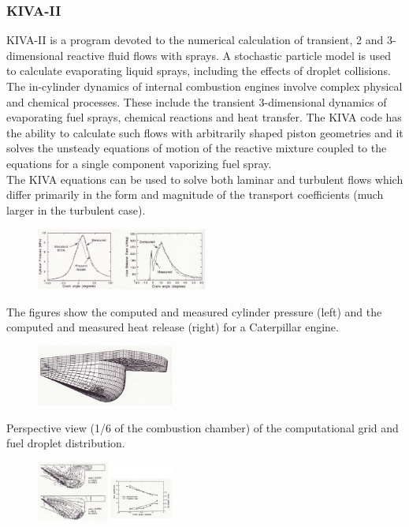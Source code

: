 \documentclass[12pt]{article}
\begin{document}
\subsubsection{KIVA-II}

KIVA-II is a program devoted to the numerical calculation of transient, 2 and 3-dimensional reactive fluid flows with sprays. A stochastic particle model is used to calculate evaporating liquid sprays, including the effects of droplet collisions.\\
The in-cylinder dynamics of internal combustion engines involve complex physical and chemical processes. These include the transient 3-dimensional dynamics of evaporating fuel sprays, chemical reactions and heat transfer. The KIVA code has the ability to calculate such flows with arbitrarily shaped piston geometries and it solves the unsteady equations of motion of the reactive mixture coupled to the equations for a single component vaporizing fuel spray.\\
The KIVA equations can be used to solve both laminar and turbulent flows which differ primarily in the form and magnitude of the transport coefficients (much larger in the turbulent case).

\begin{figure}[h!]
\centering
\includegraphics[width=0.5\textwidth]{figures/kiva.png}
\end{figure}

The figures show the computed and measured cylinder pressure (left) and the computed and measured heat release (right) for a Caterpillar engine.

\begin{figure}[h!]
\centering
\includegraphics[width=0.4\textwidth]{figures/grid.png}
\end{figure}

Perspective view (1/6 of the combustion chamber) of the computational grid and fuel droplet distribution.

\begin{figure}[h!]
\centering
\includegraphics[width=0.4\textwidth]{figures/kiva2.png}
\end{figure}
\end{document}
